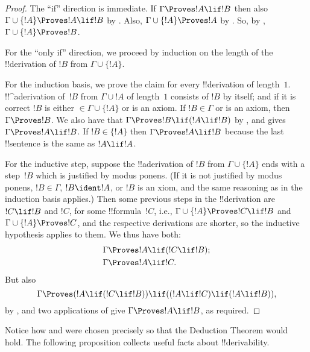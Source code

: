 \documentclass[../../include/open-logic-section]{subfiles}
\begin{document}
\begin{proof}
The ``if'' direction is immediate.  If $\Gamma \Proves !A \lif !B$
then also $\Gamma \cup \{!A\} \Proves !A \lif !B$ by
.  Also, $\Gamma \cup \{!A\} \Proves !A$ by
. So, by , $\Gamma \cup
\{!A\} \Proves !B$.

For the ``only if'' direction, we proceed by induction on the length
of the !!{derivation} of $!B$ from $\Gamma \cup \{!A\}$.

For the induction basis, we prove the claim for every !!{derivation}
of length~$1$. !!^a{derivation} of~$!B$ from $\Gamma \cup !A$ of
length~$1$ consists of $!B$ by itself; and if it is correct $!B$ is
either $\in \Gamma \cup \{!A\}$ or is an axiom.  If $!B \in \Gamma$ or
is an axiom, then $\Gamma \Proves !B$. We also have that $\Gamma
\Proves !B \lif (!A \lif !B)$ by , and
 gives $\Gamma \Proves !A \lif !B$. If $!B \in \{ !A\}$
then $\Gamma \Proves !A \lif !B$ because the last !!{sentence} is the
same as $!A \lif !A$.

For the inductive step, suppose the !!a{derivation} of $!B$ from
$\Gamma \cup \{!A\}$ ends with a step~$!B$ which is justified by modus
ponens. (If it is not justified by modus ponens, $!B \in \Gamma$, $!B
\ident !A$, or $!B$ is an xiom, and the same reasoning as in the
induction basis applies.) Then some previous steps in the
!!{derivation} are $!C \lif !B$ and $!C$, for some !!{formula}~$!C$,
i.e., $\Gamma \cup \{!A\} \Proves !C \lif !B$ and $\Gamma \cup \{!A\}
\Proves !C$, and the respective derivations are shorter, so the
inductive hypothesis applies to them. We thus have both:
\begin{align*}
  & \Gamma \Proves !A \lif (!C \lif !B); \\
  & \Gamma \Proves !A \lif !C.
\end{align*}
But also
\[
\Gamma \Proves (!A \lif (!C \lif !B)) \lif
((!A\lif !C)  \lif (!A \lif !B)),
\]
by , and two applications of  give
$\Gamma \Proves !A \lif !B$, as required.
\end{proof}

Notice how  and  were chosen
precisely so that the Deduction Theorem would hold. The following
proposition collects useful facts about !!{derivability}.
\end{document}
